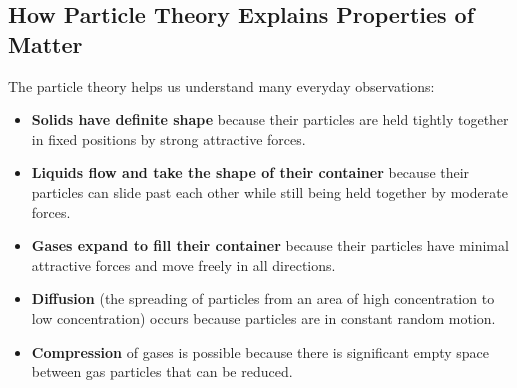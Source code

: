 \documentclass[justified,notoc]{tufte-book}
\begin{document}
\subsection{How Particle Theory Explains Properties of Matter}

The particle theory helps us understand many everyday observations:

\begin{itemize}
    \item \textbf{Solids have definite shape} because their particles are held tightly together in fixed positions by strong attractive forces.
    
    \item \textbf{Liquids flow and take the shape of their container} because their particles can slide past each other while still being held together by moderate forces.
    
    \item \textbf{Gases expand to fill their container} because their particles have minimal attractive forces and move freely in all directions.
    
    \item \textbf{Diffusion} (the spreading of particles from an area of high concentration to low concentration) occurs because particles are in constant random motion.
    
    \item \textbf{Compression} of gases is possible because there is significant empty space between gas particles that can be reduced.
\end{itemize}
\end{document}
